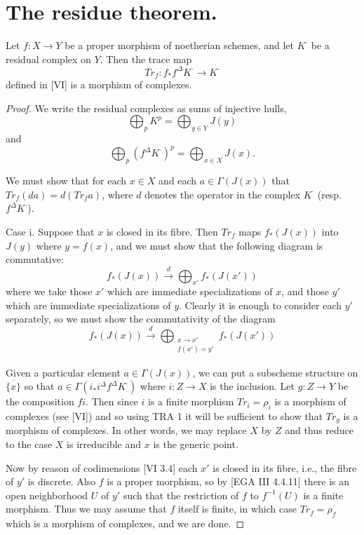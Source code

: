 \documentclass[12pt]{book}
\begin{document}
\setcounter{page}{369}
\section{The residue theorem.}

\begin{theorem}
Let \(f: X \to Y\) be a proper morphism of noetherian schemes, and let \(K^{\cdot}\) be a residual complex on \(Y\). Then the trace map
\[Tr_{f}: f_{*} f^{\Delta} K^{\cdot} \to K^{\cdot}\]
defined in [VI] is a morphism of complexes.
\end{theorem}

\begin{proof}
We write the residual complexes as sums of injective hulls,
\[\bigoplus_{p} K^{p}=\bigoplus_{y \in Y} J(y)\]
and
\[\bigoplus_{p}\left(f^{\Delta} K^{\cdot}\right)^{p}=\bigoplus_{x \in X} J(x) .\]

We must show that for each \(x \in X\) and each \(a \in \Gamma(J(x))\) that \(Tr_{f}(d a)=d(Tr_{f} a)\), where \(d\) denotes the operator in the complex \(K^{\cdot}\) (resp. \(f^{\Delta} K^{\cdot}\)).

\setcounter{page}{370}
Case i. Suppose that \(x\) is closed in its fibre. Then \(Tr_{f}\) maps \(f_{*}(J(x))\) into \(J(y)\) where \(y=f(x)\), and we must show that the following diagram is commutative:
\[f_{*}(J(x)) \stackrel{d}{\to} \bigoplus_{x'} f_{*}\left(J\left(x'\right)\right)\]
where we take those \(x'\) which are immediate specializations of \(x\), and those \(y'\) which are immediate specializations of \(y\). Clearly it is enough to consider each \(y'\) separately, so we must show the commutativity of the diagram
\[f_{*}(J(x)) \stackrel{d}{\to} \bigoplus_{\substack{x \to x' \\ f(x')=y'}} f_{*}\left(J\left(x'\right)\right)\]

\setcounter{page}{371}
Given a particular element \(a \in \Gamma(J(x))\), we can put a subscheme structure on \(\overline{\{x\}}\) so that \(a \in \Gamma(i_{*} i^{\Delta} f^{\Delta} K^{\cdot})\) where \(i: Z \to X\) is the inclusion. Let \(g: Z \to Y\) be the composition \(fi\). Then since \(i\) is a finite morphism \(Tr_{i}=\rho_{i}\) is a morphism of complexes (see [VI]) and so using TRA 1 it will be sufficient to show that \(Tr_{g}\) is a morphism of complexes. In other words, we may replace \(X\) by \(Z\) and thus reduce to the case \(X\) is irreducible and \(x\) is the generic point.

Now by reason of codimensions [VI 3.4] each \(x'\) is closed in its fibre, i.e., the fibre of \(y'\) is discrete. Also \(f\) is a proper morphism, so by [EGA III 4.4.11] there is an open neighborhood \(U\) of \(y'\) such that the restriction of \(f\) to \(f^{-1}(U)\) is a finite morphism. Thus we may assume that \(f\) itself is finite, in which case \(Tr_{f}=\rho_{f}\) which is a morphism of complexes, and we are done.


\end{proof}
\end{document}
